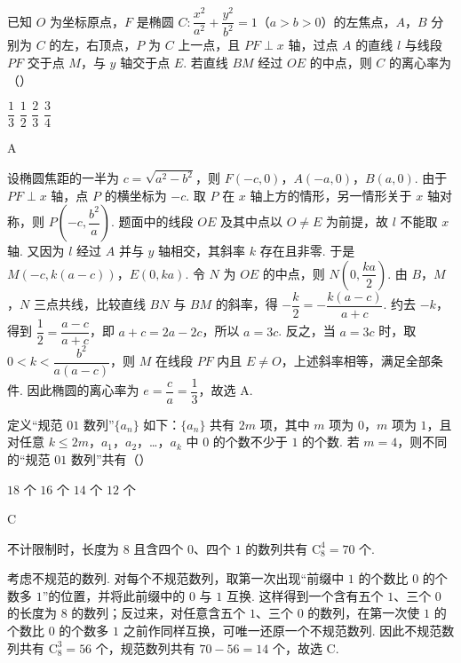 \begin{problem}
已知 \(O\) 为坐标原点，\(F\) 是椭圆 \(C:\dfrac{x^2}{a^2}+\dfrac{y^2}{b^2}=1\)（\(a>b>0\)）的左焦点，\(A\)，\(B\) 分别为 \(C\) 的左，右顶点，\(P\) 为 \(C\) 上一点，且 \(PF\perp x\) 轴，过点 \(A\) 的直线 \(l\) 与线段 \(PF\) 交于点 \(M\)，与 \(y\) 轴交于点 \(E\). 若直线 \(BM\) 经过 \(OE\) 的中点，则 \(C\) 的离心率为（\quad）

\choices
    {\(\dfrac13\)}
    {\(\dfrac12\)}
    {\(\dfrac23\)}
    {\(\dfrac34\)}
\end{problem}

\begin{answer}
A
\end{answer}

\begin{solution}
设椭圆焦距的一半为 \(c=\sqrt{a^2-b^2}\)，则 \(F(-c,0)\)，\(A(-a,0)\)，\(B(a,0)\). 由于 \(PF\perp x\) 轴，点 \(P\) 的横坐标为 \(-c\). 取 \(P\) 在 \(x\) 轴上方的情形，另一情形关于 \(x\) 轴对称，则 \(P\left(-c,\dfrac{b^2}{a}\right)\). 题面中的线段 \(OE\) 及其中点以 \(O\ne E\) 为前提，故 \(l\) 不能取 \(x\) 轴. 又因为 \(l\) 经过 \(A\) 并与 \(y\) 轴相交，其斜率 \(k\) 存在且非零. 于是 \(M(-c,k(a-c))\)，\(E(0,ka)\). 令 \(N\) 为 \(OE\) 的中点，则 \(N\left(0,\dfrac{ka}{2}\right)\). 由 \(B\)，\(M\)，\(N\) 三点共线，比较直线 \(BN\) 与 \(BM\) 的斜率，得 \(-\dfrac{k}{2}=-\dfrac{k(a-c)}{a+c}\). 约去 \(-k\)，得到 \(\dfrac12=\dfrac{a-c}{a+c}\)，即 \(a+c=2a-2c\)，所以 \(a=3c\). 反之，当 \(a=3c\) 时，取 \(0<k<\dfrac{b^2}{a(a-c)}\)，则 \(M\) 在线段 \(PF\) 内且 \(E\ne O\)，上述斜率相等，满足全部条件. 因此椭圆的离心率为 \(e=\dfrac ca=\dfrac13\)，故选 A.
\end{solution}

\begin{problem}
定义“规范 \(01\) 数列”\(\{a_n\}\) 如下：\(\{a_n\}\) 共有 \(2m\) 项，其中 \(m\) 项为 \(0\)，\(m\) 项为 \(1\)，且对任意 \(k\le2m\)，\(a_1\)，\(a_2\)，\dots，\(a_k\) 中 \(0\) 的个数不少于 \(1\) 的个数. 若 \(m=4\)，则不同的“规范 \(01\) 数列”共有（\quad）

\choices
    {\(18\) 个}
    {\(16\) 个}
    {\(14\) 个}
    {\(12\) 个}
\end{problem}

\begin{answer}
C
\end{answer}

\begin{solution}
不计限制时，长度为 \(8\) 且含四个 \(0\)、四个 \(1\) 的数列共有 \(\mathrm C_8^4=70\) 个.

考虑不规范的数列. 对每个不规范数列，取第一次出现“前缀中 \(1\) 的个数比 \(0\) 的个数多 \(1\)”的位置，并将此前缀中的 \(0\) 与 \(1\) 互换. 这样得到一个含有五个 \(1\)、三个 \(0\) 的长度为 \(8\) 的数列；反过来，对任意含五个 \(1\)、三个 \(0\) 的数列，在第一次使 \(1\) 的个数比 \(0\) 的个数多 \(1\) 之前作同样互换，可唯一还原一个不规范数列. 因此不规范数列共有 \(\mathrm C_8^3=56\) 个，规范数列共有 \(70-56=14\) 个，故选 C.
\end{solution}

